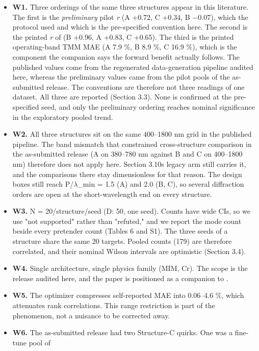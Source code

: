 \documentclass[11pt,a4paper]{article}
\begin{document}
\begin{itemize}
\item
  \textbf{W1.} Three orderings of the same three structures appear in this literature. The
  first is the \emph{preliminary} pilot \emph{r} (A +0.72, C +0.34, B \ensuremath{-}0.07), which the protocol
  used and which is the pre-specified convention here. The second is the printed \emph{r} of
  \cite{choi20261} (B +0.96, A +0.83, C +0.65). The third is the printed operating-band TMM MAE (A
  7.9 \%, B 8.9 \%, C 16.9 \%), which is the component the companion says the forward benefit
  actually follows. The published values come from the regenerated data-generation
  pipeline audited here, whereas the preliminary values came from the pilot pools of the
  as-submitted release. The conventions are therefore not three readings of one dataset.
  All three are reported (Section 3.3). None is confirmed at the pre-specified seed, and
  only the preliminary ordering reaches nominal significance in the exploratory pooled
  trend.
\item
  \textbf{W2.} All three structures sit on the same 400--1800 nm grid in the published pipeline.
  The band mismatch that constrained cross-structure comparison in the as-submitted
  release (A on 380--780 nm against B and C on 400--1800 nm) therefore does not apply here.
  Section 3.10\textquotesingle s legacy arm still carries it, and the comparisons there stay dimensionless
  for that reason. The design boxes still reach P/\ensuremath{\lambda}\_min = 1.5 (A) and 2.0 (B, C), so
  several diffraction orders are open at the short-wavelength end on every structure.
\item
  \textbf{W3.} N = 20/structure/seed (D: 50, one seed). Counts have wide CIs, so we use "not
  supported" rather than "refuted," and we report the mode count beside every pretender
  count (Tables 6 and S1). The three seeds of a structure share the same 20 targets.
  Pooled counts (179) are therefore correlated, and their nominal Wilson intervals are
  optimistic (Section 3.4).
\item
  \textbf{W4.} Single architecture, single physics family (MIM, Cr). The scope is the release
  audited here, and the paper is positioned as a companion to \cite{choi20261}.
\item
  \textbf{W5.} The optimizer compresses self-reported MAE into 0.06--4.6 \%, which attenuates
  rank correlations. This range restriction is part of the phenomenon, not a nuisance to
  be corrected away.
\item
  \textbf{W6.} The as-submitted release had two Structure-C quirks. One was a fine-tune pool of

\end{itemize}
\end{document}
